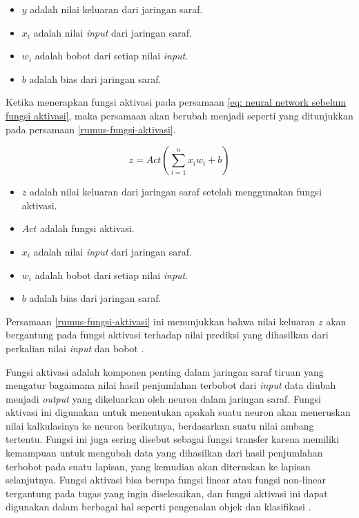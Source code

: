 \begin{itemize}

    \item $y$ adalah nilai keluaran dari jaringan saraf.
    \item $x_i$ adalah nilai \textit{input} dari jaringan saraf.
    \item $w_i$ adalah bobot dari setiap nilai \textit{input}.
    \item $b$ adalah bias dari jaringan saraf.

\end{itemize}

\par Ketika menerapkan fungsi aktivasi pada persamaan \ref{eq: neural network sebelum fungsi aktivasi}, maka persamaan akan berubah menjadi seperti yang ditunjukkan pada persamaan \ref{rumus-fungsi-aktivasi}.


\begin{equation}
    z = \textit{Act}(\sum_{i=1}^n x_i w_i + b)
    \label{rumus-fungsi-aktivasi}
\end{equation}

\begin{itemize}
    \item $z$ adalah nilai keluaran dari jaringan saraf setelah menggunakan fungsi aktivasi.
    \item $Act$ adalah fungsi aktivasi.
    \item $x_i$ adalah nilai \textit{input} dari jaringan saraf.
    \item $w_i$ adalah bobot dari setiap nilai \textit{input}.
    \item $b$ adalah bias dari jaringan saraf.
\end{itemize}

\par Persamaan \ref{rumus-fungsi-aktivasi} ini menunjukkan bahwa nilai keluaran $z$ akan bergantung pada fungsi aktivasi terhadap nilai prediksi yang dihasilkan dari perkalian nilai \textit{input} dan bobot \citep{kristiyanti2023machine}. 

\par Fungsi aktivasi adalah komponen penting dalam jaringan saraf tiruan yang mengatur bagaimana nilai hasil penjumlahan terbobot dari \textit{input} data diubah menjadi \textit{output} yang dikeluarkan oleh neuron dalam jaringan saraf. Fungsi aktivasi ini digunakan untuk menentukan apakah suatu neuron akan meneruskan nilai kalkulasinya ke neuron berikutnya, berdasarkan suatu nilai ambang tertentu. Fungsi ini juga sering disebut sebagai fungsi transfer karena memiliki kemampuan untuk mengubah data yang dihasilkan dari hasil penjumlahan terbobot pada suatu lapisan, yang kemudian akan diteruskan ke lapisan selanjutnya. Fungsi aktivasi bisa berupa fungsi linear atau fungsi non-linear tergantung pada tugas yang ingin diselesaikan, dan fungsi aktivasi ini dapat digunakan dalam berbagai hal seperti pengenalan objek dan klasifikasi \citep{nwankpa2018activation}.

